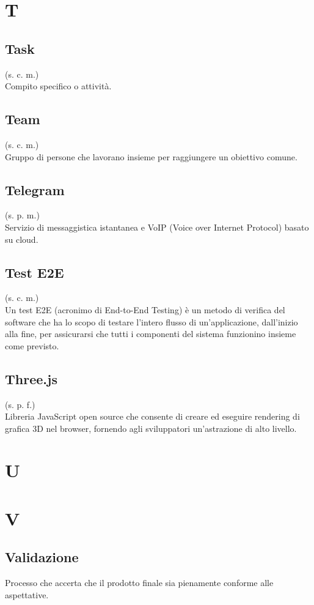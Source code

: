 \section{T}
    \subsection{Task}
    (s. c. m.)\\
    Compito specifico o attività.
    \subsection{Team}
    (s. c. m.)\\
    \label{Team}
    Gruppo di persone che lavorano insieme per raggiungere un obiettivo comune.
    \subsection{Telegram}
    (s. p. m.)\\
    Servizio di messaggistica istantanea e VoIP (Voice over Internet Protocol)
    basato su cloud.
    \subsection{Test E2E}
    (s. c. m.)\\
    Un test E2E (acronimo di End-to-End Testing) è un metodo di verifica del software che ha lo scopo di testare 
    l'intero flusso di un'applicazione, dall'inizio alla fine, per assicurarsi che tutti i componenti del sistema 
    funzionino insieme come previsto.
    \subsection{Three.js}
    (s. p. f.)\\
    Libreria JavaScript open source che consente di creare ed eseguire rendering 
    di grafica 3D nel browser, fornendo agli sviluppatori un'astrazione di alto livello.
\pagebreak
\section{U}
\pagebreak
\section{V}
    \subsection{Validazione}
    Processo che accerta che il prodotto finale sia pienamente conforme alle aspettative.
